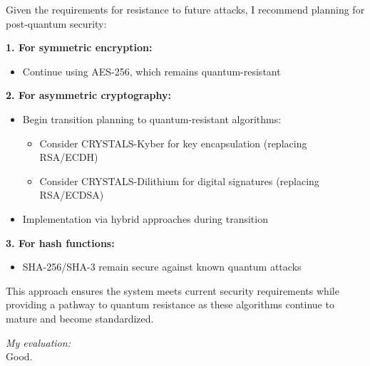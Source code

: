 \documentclass{article}
\begin{document}
\begin{enumerate}[label=\textbf{Task \arabic*:}]
\begin{tcolorbox}
		\noindent Given the requirements for resistance to future attacks, I recommend planning for post-quantum security:
		
		\medskip
		\noindent\textbf{1. For symmetric encryption:}
		\begin{itemize}
			\item Continue using AES-256, which remains quantum-resistant
		\end{itemize}
		
		\noindent\textbf{2. For asymmetric cryptography:}
		\begin{itemize}
			\item Begin transition planning to quantum-resistant algorithms:
			\begin{itemize}
				\item Consider CRYSTALS-Kyber for key encapsulation (replacing RSA/ECDH)
				\item Consider CRYSTALS-Dilithium for digital signatures (replacing RSA/ECDSA)
			\end{itemize}
			\item Implementation via hybrid approaches during transition
		\end{itemize}
		
		\noindent\textbf{3. For hash functions:}
		\begin{itemize}
			\item SHA-256/SHA-3 remain secure against known quantum attacks
		\end{itemize}
		
		\medskip
		\noindent This approach ensures the system meets current security requirements while providing a pathway to quantum resistance as these algorithms continue to mature and become standardized.
		\end{tcolorbox}
		
		\textit{My evaluation:}\\
		Good.
	\end{enumerate}
	
	\printbibliography
\end{document}
